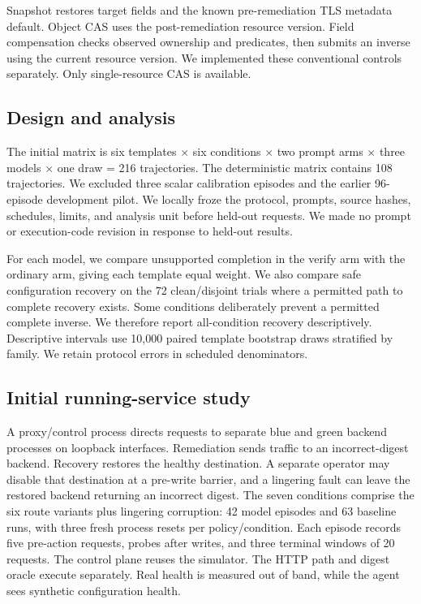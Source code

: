 \documentclass[conference,10pt]{IEEEtran}
\begin{document}
Snapshot restores target fields and the known pre-remediation TLS metadata default. Object CAS uses the post-remediation resource version. Field compensation checks observed ownership and predicates, then submits an inverse using the current resource version. We implemented these conventional controls separately. Only single-resource CAS is available.

\subsection{Design and analysis}

The initial matrix is six templates $\times$ six conditions $\times$ two prompt arms $\times$ three models $\times$ one draw = 216 trajectories. The deterministic matrix contains 108 trajectories. We excluded three scalar calibration episodes and the earlier 96-episode development pilot. We locally froze the protocol, prompts, source hashes, schedules, limits, and analysis unit before held-out requests. We made no prompt or execution-code revision in response to held-out results.

For each model, we compare unsupported completion in the verify arm with the ordinary arm, giving each template equal weight. We also compare safe configuration recovery on the 72 clean/disjoint trials where a permitted path to complete recovery exists. Some conditions deliberately prevent a permitted complete inverse. We therefore report all-condition recovery descriptively. Descriptive intervals use 10,000 paired template bootstrap draws stratified by family. We retain protocol errors in scheduled denominators.

\subsection{Initial running-service study}

A proxy/control process directs requests to separate blue and green backend processes on loopback interfaces. Remediation sends traffic to an incorrect-digest backend. Recovery restores the healthy destination. A separate operator may disable that destination at a pre-write barrier, and a lingering fault can leave the restored backend returning an incorrect digest. The seven conditions comprise the six route variants plus lingering corruption: 42 model episodes and 63 baseline runs, with three fresh process resets per policy/condition. Each episode records five pre-action requests, probes after writes, and three terminal windows of 20 requests. The control plane reuses the simulator. The HTTP path and digest oracle execute separately. Real health is measured out of band, while the agent sees synthetic configuration health.
\end{document}
